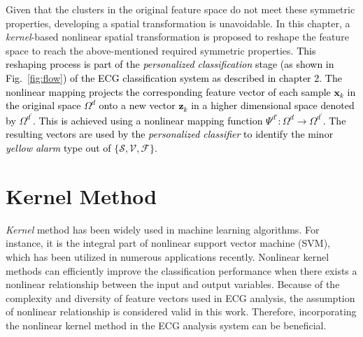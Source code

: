 Given that the clusters in the original feature space do not meet these symmetric properties, developing a spatial transformation is unavoidable. In this chapter, a \textit{kernel}-based nonlinear spatial transformation is proposed to reshape the feature space to reach the above-mentioned required symmetric properties. 
\textcolor{black}{This reshaping process is part of the \textcolor{black}{\textit{personalized classification}} stage (as shown in Fig.~\ref{fig:flow}) of the ECG classification system as described in chapter 2. The nonlinear mapping projects the corresponding feature vector of each sample $\mathbf{x}_k$  in the original space $\Omega^d$ onto a new vector $\mathbf{z}_k$ in a higher dimensional space denoted by $\Omega^{d^\prime}$.  This is achieved using a nonlinear mapping function $\Psi^{d'}:\Omega^{d} \rightarrow \Omega^{d^\prime}$. The resulting vectors are used by the \textit{personalized classifier} to identify the minor \textit{yellow alarm} type out of $\{\mathcal{S},\mathcal{V},\mathcal{F}\}$.} 

  

\section{Kernel Method}

\textit{Kernel} method has been widely used in machine learning algorithms. For instance, it is the integral part of nonlinear support vector machine (SVM), which has been utilized in numerous applications recently\cite{shawe2004kernel}. Nonlinear kernel methods can efficiently improve the classification performance when there exists a nonlinear relationship between the input and output variables. Because of the complexity and diversity of feature vectors used in ECG analysis, the assumption of nonlinear relationship is considered valid in this work. Therefore, incorporating the nonlinear kernel method in the ECG analysis system can be beneficial.

